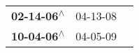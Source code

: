 \begin{supertabular}{lll}
 \textbf{02-14-06\textsuperscript{$\wedge$}} &  04-13-08\textsuperscript{} \\
 \textbf{10-04-06\textsuperscript{$\wedge$}} &  04-05-09\textsuperscript{} \\
\end{supertabular}
